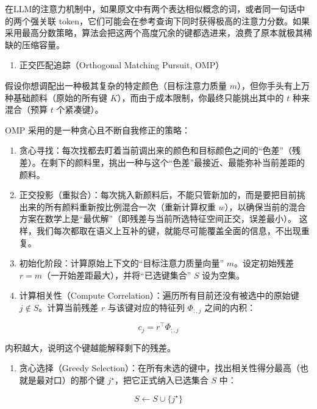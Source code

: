 在LLM的注意力机制中，如果原文中有两个表达相似概念的词，或者同一句话中的两个强关联 token，它们可能会在参考查询下同时获得极高的注意力分数。如果采用最高分数策略，算法会把这两个高度冗余的键都选进来，浪费了原本就极其稀缺的压缩容量。

\begin{enumerate}
\def\labelenumi{\arabic{enumi}.}
\setcounter{enumi}{1}
\tightlist
\item
  正交匹配追踪（Orthogonal Matching Pursuit, OMP）
\end{enumerate}

假设你想调配出一种极其复杂的特定颜色（目标注意力质量 \(m\)），但你手头有上万种基础颜料（原始的所有键 \(K\)），而由于成本限制，你最终只能挑出其中的 \(t\) 种来混合（预算 \(t\) 个紧凑键）。

OMP 采用的是一种贪心且不断自我修正的策略：

\begin{enumerate}
\def\labelenumi{\arabic{enumi}.}
\item
  贪心寻找：每次找都去盯着当前调出来的颜色和目标颜色之间的``色差''（残差）。在剩下的颜料里，挑出一种与这个``色差''最接近、最能弥补当前差距的颜料。
\item
  正交投影（重拟合）：每次挑入新颜料后，不能只管新加的，而是要把目前挑出来的所有颜料重新按比例混合一次（重新计算权重 \(w\)），以确保当前的混合方案在数学上是``最优解''（即残差与当前所选特征空间正交，误差最小）。
  这样，我们每次都取在语义上互补的键，就能尽可能覆盖全面的信息，不出现重复。
\item
  初始化阶段：计算原始上下文的``目标注意力质量向量'' \(m\)。设定初始残差 \(r = m\)（一开始差距最大），并将``已选键集合'' \(S\) 设为空集。
\item
  计算相关性（Compute Correlation）：遍历所有目前还没有被选中的原始键 \(j \notin S\)。计算当前残差 \(r\) 与该键对应的特征列 \(\Phi_{:,j}\) 之间的内积：
\end{enumerate}

\[
c_j = r^\top \Phi_{:,j}
\]

内积越大，说明这个键越能解释剩下的残差。

\begin{enumerate}
\def\labelenumi{\arabic{enumi}.}
\setcounter{enumi}{2}
\tightlist
\item
  贪心选择（Greedy Selection）：在所有未选的键中，找出相关性得分最高（也就是最对口）的那个键 \(j^\star\)，把它正式纳入已选集合 \(S\) 中：
\end{enumerate}

\[
S \leftarrow S \cup \{j^\star\}
\]


